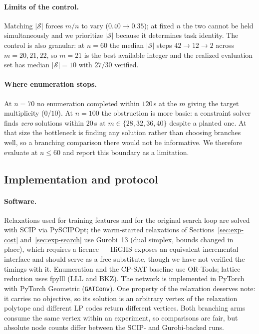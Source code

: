 \documentclass[final,5p,times,twocolumn]{elsarticle}
\newcommand{\SOL}{\mathcal{S}}
\begin{document}
\paragraph{Limits of the control.} Matching $|\SOL|$ forces $m/n$ to vary ($0.40\to0.35$); at fixed $n$ the two cannot be held simultaneously and we prioritize $|\SOL|$ because it determines task identity. The control is also granular: at $n=60$ the median $|\SOL|$ steps $42\to12\to2$ across $m=20,21,22$, so $m=21$ is the best available integer and the realized evaluation set has median $|\SOL|=10$ with $27/30$ verified.

\paragraph{Where enumeration stops.} At $n=70$ no enumeration completed within $120$\,s at the $m$ giving the target multiplicity ($0/10$). At $n=100$ the obstruction is more basic: a constraint solver finds \emph{zero} solutions within $20$\,s at $m\in\{28,32,36,40\}$ despite a planted one. At that size the bottleneck is finding any solution rather than choosing branches well, so a branching comparison there would not be informative. We therefore evaluate at $n\le 60$ and report this boundary as a limitation.

\subsection{Implementation and protocol}
\label{sec:exp-protocol}

\paragraph{Software.} Relaxations used for training features and for the original search loop are solved with SCIP via PySCIPOpt; the warm-started relaxations of Sections~\ref{sec:exp-cost} and~\ref{sec:exp-search} use Gurobi~13 (dual simplex, bounds changed in place), which requires a licence --- HiGHS exposes an equivalent incremental interface and should serve as a free substitute, though we have not verified the timings with it. Enumeration and the CP-SAT baseline use OR-Tools; lattice reduction uses fpylll (LLL and BKZ). The network is implemented in PyTorch with PyTorch Geometric (\texttt{GATConv}). One property of the relaxation deserves note: it carries no objective, so its solution is an arbitrary vertex of the relaxation polytope and different LP codes return different vertices. Both branching arms consume the same vertex within an experiment, so comparisons are fair, but absolute node counts differ between the SCIP- and Gurobi-backed runs.
\end{document}
